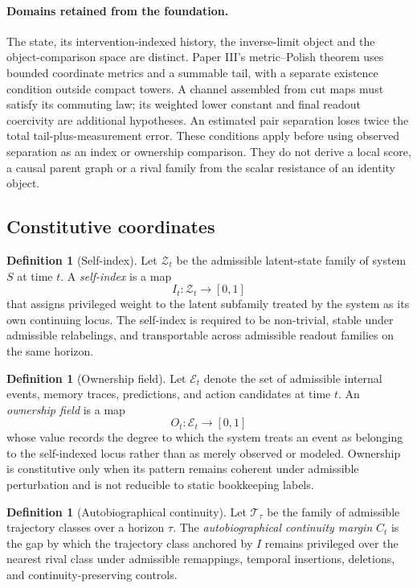 \documentclass[11pt,a4paper]{article}
\theoremstyle{definition}
\newtheorem{definition}[theorem]{Definition}
\newcommand{\SelfIndex}{I}
\newcommand{\OwnField}{O}
\newcommand{\ContField}{C}
\begin{document}
\paragraph{Domains retained from the foundation.}
The state, its intervention-indexed history, the inverse-limit object and the
object-comparison space are distinct. Paper III's metric--Polish theorem uses
bounded coordinate metrics and a summable tail, with a separate existence
condition outside compact towers. A channel assembled from cut maps must
satisfy its commuting law; its weighted lower constant and final readout
coercivity are additional hypotheses. An estimated pair separation loses
twice the total tail-plus-measurement error. These conditions apply before
using observed separation as an index or ownership comparison. They do not
derive a local score, a causal parent graph or a rival family from the scalar
resistance of an identity object.

\subsection{Constitutive coordinates}
\begin{definition}[Self-index]\label{def:selfindex}
Let $\mathcal{Z}_t$ be the admissible latent-state family of system $S$ at time $t$. A \emph{self-index} is a map
\[
\SelfIndex_t : \mathcal{Z}_t \to [0,1]
\]
that assigns privileged weight to the latent subfamily treated by the system as its own continuing locus. The self-index is required to be non-trivial, stable under admissible relabelings, and transportable across admissible readout families on the same horizon.
\end{definition}

\begin{definition}[Ownership field]\label{def:ownership}
Let $\mathcal{E}_t$ denote the set of admissible internal events, memory traces, predictions, and action candidates at time $t$. An \emph{ownership field} is a map
\[
\OwnField_t : \mathcal{E}_t \to [0,1]
\]
whose value records the degree to which the system treats an event as belonging to the self-indexed locus rather than as merely observed or modeled. Ownership is constitutive only when its pattern remains coherent under admissible perturbation and is not reducible to static bookkeeping labels.
\end{definition}

\begin{definition}[Autobiographical continuity]\label{def:continuity}
Let $\mathcal{T}_\tau$ be the family of admissible trajectory classes over a horizon $\tau$. The \emph{auto\-bio\-graphical continuity margin} $\ContField_t$ is the gap by which the trajectory class anchored by $\SelfIndex$ remains privileged over the nearest rival class under admissible remappings, temporal insertions, deletions, and continuity-preserving controls.
\end{definition}
\end{document}
